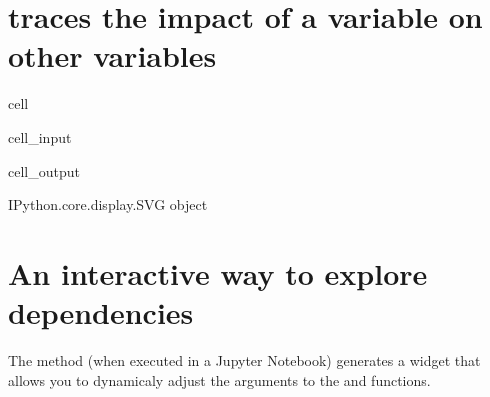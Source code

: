 \documentclass[letterpaper,10pt,english]{jupyterBook}
\begin{document}
\chapter{ traces the impact of a variable on other variables}
\label{\detokenize{content/06_ModelAnalytics/ModelStructure:tracedep-traces-the-impact-of-a-variable-on-other-variables}}
\begin{sphinxuseclass}{cell}\begin{sphinxVerbatimInput}

\begin{sphinxuseclass}{cell_input}
\begin{sphinxVerbatim}[commandchars=\\\{\}]
\end{sphinxVerbatim}

\end{sphinxuseclass}\end{sphinxVerbatimInput}
\begin{sphinxVerbatimOutput}

\begin{sphinxuseclass}{cell_output}
\begin{sphinxVerbatim}[commandchars=\\\{\}]
\PYGZlt{}IPython.core.display.SVG object\PYGZgt{}
\end{sphinxVerbatim}

\end{sphinxuseclass}\end{sphinxVerbatimOutput}

\end{sphinxuseclass}

\chapter{ An interactive way to explore dependencies}
\label{\detokenize{content/06_ModelAnalytics/ModelStructure:modeldash-an-interactive-way-to-explore-dependencies}}
\sphinxAtStartPar
The  method (when executed in a Jupyter Notebook) generates a widget that allows you to dynamicaly adjust the arguments to the  and  functions.
\end{document}
